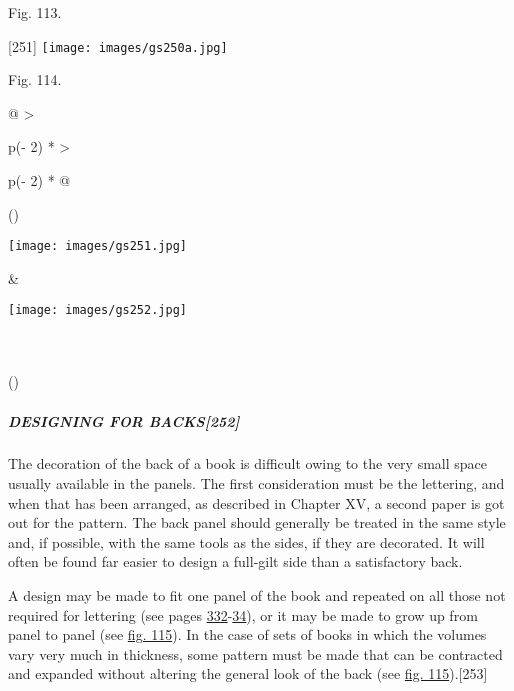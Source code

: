 \documentclass[
]{article}
\begin{document}
Fig. 113.

{\protect\hypertarget{Page_251}{}{{[}251{]}}}
\texttt{[image: images/gs250a.jpg]}

Fig. 114.

\begin{longtable}[]{@{}
  >{\raggedright\arraybackslash}p{(\columnwidth - 2\tabcolsep) * }
  >{\raggedright\arraybackslash}p{(\columnwidth - 2\tabcolsep) * }@{}}
\toprule()
\endhead
\begin{minipage}[t]{\linewidth}\raggedright
\texttt{[image: images/gs251.jpg]}
\end{minipage} & \begin{minipage}[t]{\linewidth}\raggedright
\protect\hypertarget{Fig_115}{}{}
\texttt{[image: images/gs252.jpg]}
\end{minipage} \\
 \\
\bottomrule()
\end{longtable}

\hypertarget{designing-for-backs252}{%
\subparagraph[DESIGNING FOR BACKS]{\texorpdfstring{DESIGNING FOR
BACKS{\protect\hypertarget{Page_252}{}{{[}252{]}}}}{DESIGNING FOR BACKS{[}252{]}}}\label{designing-for-backs252}}

The decoration of the back of a book is difficult owing to the very
small space usually available in the panels. The first consideration
must be the lettering, and when that has been arranged, as described in
Chapter XV, a second paper is got out for the pattern. The back panel
should generally be treated in the same style and, if possible, with the
same tools as the sides, if they are decorated. It will often be found
far easier to design a full-gilt side than a satisfactory back.

A design may be made to fit one panel of the book and repeated on all
those not required for lettering (see pages
\protect\hyperlink{Page_332}{332}-\protect\hyperlink{Page_334}{34}), or
it may be made to grow up from panel to panel (see
\protect\hyperlink{Fig_115}{fig. 115}). In the case of sets of books in
which the volumes vary very much in thickness, some pattern must be made
that can be contracted and expanded without altering the general look of
the back (see \protect\hyperlink{Fig_115}{fig.
115}).{\protect\hypertarget{Page_253}{}{{[}253{]}}}
\end{document}
